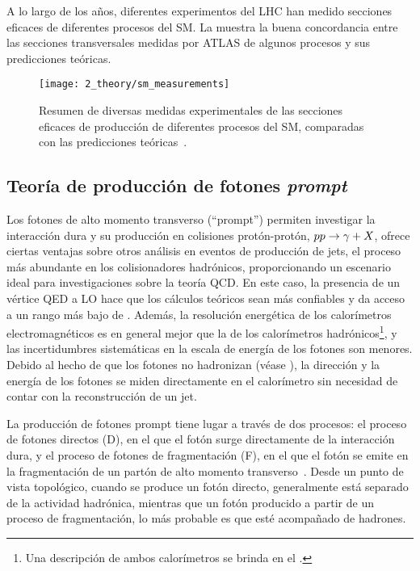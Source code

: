 A lo largo de los años, diferentes experimentos del \ac{LHC} han medido secciones eficaces de diferentes procesos del \ac{SM}. La \Fig{\ref{fig:theory:sm:hadron_interactions:sm_results}} muestra la buena concordancia entre las secciones transversales medidas por \ac{ATLAS} de algunos procesos y sus predicciones teóricas.


\begin{figure}[ht!]
    \centering
    \texttt{[image: 2\_theory/sm\_measurements]}
    \caption{Resumen de diversas medidas experimentales de las secciones eficaces de producci\'on de diferentes procesos del \ac{SM}, comparadas con las predicciones te\'oricas~\cite{ATLAS-SM_Measurements}.}
    \label{fig:theory:sm:hadron_interactions:sm_results}
\end{figure}



\subsection{Teor\'ia de producci\'on de fotones \textit{prompt}}
\label{subsec:theory:sm:prompt_photon}


Los fotones de alto momento transverso (\enquote{prompt}) permiten investigar la interacción dura y su producción en colisiones protón-protón, \(pp \rightarrow \gamma+X\), ofrece ciertas ventajas sobre otros análisis en eventos de producción de jets, el proceso más abundante en los colisionadores hadrónicos, proporcionando un escenario ideal para investigaciones sobre la teor\'ia \ac{QCD}. En este caso, la presencia de un vértice \ac{QED} a \ac{LO} hace que los cálculos teóricos sean más confiables y da acceso a un rango más bajo de \pt. Además, la resolución energética de los calorímetros electromagnéticos es en general mejor que la de los calorímetros hadrónicos\footnote{Una descripci\'on de ambos calor\'imetros se brinda en el \Ch{\ref{ch:atlas}}.}, y las incertidumbres sistemáticas en la escala de energía de los fotones son menores. Debido al hecho de que los fotones no hadronizan (véase \Sect{\ref{subsec:theory:mc_simulation:hadronisation}}), la dirección y la energía de los fotones se miden directamente en el calorímetro sin necesidad de contar con la reconstrucci\'on de un jet.

La producción de fotones prompt tiene lugar a través de dos procesos: el proceso de fotones directos (D), en el que el fotón surge directamente de la interacción dura, y el proceso de fotones de fragmentación (F), en el que el fotón se emite en la fragmentación de un partón de alto momento transverso~\cite{Szczurek_Pietrycki-2007,Belghobsi_Fontannaz-2009}. Desde un punto de vista topológico, cuando se produce un fotón directo, generalmente est\'a separado de la actividad hadrónica, mientras que un fotón producido a partir de un proceso de fragmentación, lo más probable es que esté acompañado de hadrones.

